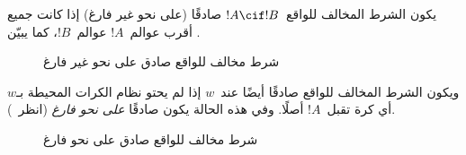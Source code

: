 \documentclass[../../../include/open-logic-section]{subfiles}
\begin{document}


يكون الشرط المخالف للواقع~$!A \cif !B$ صادقًا (على نحو غير فارغ) إذا
كانت جميع أقرب عوالم~$!A$ عوالم~$!B$، كما يبيّن
.
\begin{figure}
\begin{center}
\caption{شرط مخالف للواقع صادق على نحو غير فارغ}
\end{center}
\end{figure}
ويكون الشرط المخالف للواقع صادقًا أيضًا عند~$w$ إذا لم يحتو نظام الكرات
المحيطة بـ$w$ أي كرة تقبل~$!A$ أصلًا. وفي هذه الحالة يكون صادقًا
\emph{على نحو فارغ} (انظر~).
\begin{figure}
\begin{center}
\caption{شرط مخالف للواقع صادق على نحو فارغ}
\end{center}
\end{figure}
\end{document}
